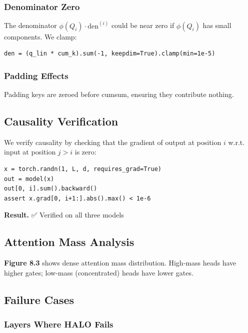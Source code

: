 \subsubsection{Denominator Zero}

The denominator $\phi(Q_i) \cdot \text{den}^{(i)}$ could be near zero if 
$\phi(Q_i)$ has small components. We clamp:

\begin{lstlisting}
den = (q_lin * cum_k).sum(-1, keepdim=True).clamp(min=1e-5)
\end{lstlisting}

\subsubsection{Padding Effects}

Padding keys are zeroed before cumsum, ensuring they contribute nothing.

\subsection{Causality Verification}

We verify causality by checking that the gradient of output at position $i$ 
w.r.t. input at position $j > i$ is zero:

\begin{lstlisting}
x = torch.randn(1, L, d, requires_grad=True)
out = model(x)
out[0, i].sum().backward()
assert x.grad[0, i+1:].abs().max() < 1e-6
\end{lstlisting}

\textbf{Result.} ✅ Verified on all three models

\subsection{Attention Mass Analysis}

\textbf{Figure 8.3} shows dense attention mass distribution. High-mass heads 
have higher gates; low-mass (concentrated) heads have lower gates.

\subsection{Failure Cases}

\subsubsection{Layers Where HALO Fails}

